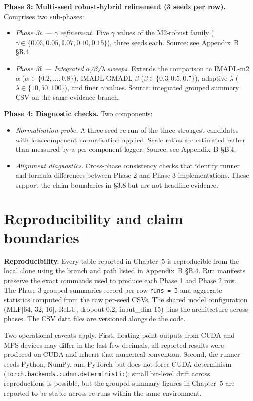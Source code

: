 \textbf{Phase 3: Multi-seed robust-hybrid refinement (3 seeds per row).} Comprises two sub-phases:
\begin{itemize}
 \item \emph{Phase 3a --- $\gamma$ refinement.} Five $\gamma$ values of the M2-robust family ($\gamma \in \{0.03, 0.05, 0.07, 0.10, 0.15\}$), three seeds each. Source: see Appendix~B \S B.4.
 \item \emph{Phase 3b --- Integrated $\alpha$/$\beta$/$\lambda$ sweeps.} Extends the comparison to IMADL-m2 $\alpha$ ($\alpha \in \{0.2, \ldots, 0.8\}$), IMADL-GMADL $\beta$ ($\beta \in \{0.3, 0.5, 0.7\}$), adaptive-$\lambda$ ($\lambda \in \{10, 50, 100\}$), and finer $\gamma$ values. Source: integrated grouped summary CSV on the same evidence branch.
\end{itemize}

\textbf{Phase 4: Diagnostic checks.} Two components:
\begin{itemize}
 \item \emph{Normalisation probe.} A three-seed re-run of the three strongest candidates with loss-component normalisation applied. Scale ratios are estimated rather than measured by a per-component logger. Source: see Appendix~B \S B.4.
 \item \emph{Alignment diagnostics.} Cross-phase consistency checks that identify runner and formula differences between Phase 2 and Phase 3 implementations. These support the claim boundaries in \S3.8 but are not headline evidence.
\end{itemize}

\section{Reproducibility and claim boundaries}

\label{sec:reproducibility}

\textbf{Reproducibility.} Every table reported in Chapter~5 is reproducible from the local clone using the branch and path listed in Appendix~B \S B.4. Run manifests preserve the exact commands used to produce each Phase 1 and Phase 2 row. The Phase 3 grouped summaries record per-row \texttt{runs = 3} and aggregate statistics computed from the raw per-seed CSVs. The shared model configuration (MLP[64, 32, 16], ReLU, dropout 0.2, input\_dim 15) pins the architecture across phases. The CSV data files are versioned alongside the code.

Two operational caveats apply. First, floating-point outputs from CUDA and MPS devices may differ in the last few decimals; all reported results were produced on CUDA and inherit that numerical convention. Second, the runner seeds Python, NumPy, and PyTorch but does not force CUDA determinism (\texttt{torch.backends.cudnn.deterministic}); small bit-level drift across reproductions is possible, but the grouped-summary figures in Chapter~5 are reported to be stable across re-runs within the same environment.

